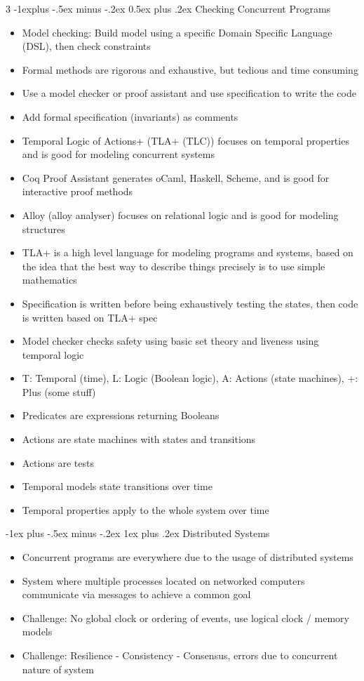 \documentclass[10pt, landscape]{article}
\makeatletter
\renewcommand{\section}{\@startsection{section}{1}{0mm}%
                                {-1ex plus -.5ex minus -.2ex}%
                                {0.5ex plus .2ex}%
                                {\normalfont\large\bfseries}}
\renewcommand{\section}{\@startsection{section}{2}{0mm}%
                                {-1explus -.5ex minus -.2ex}%
                                {0.5ex plus .2ex}%
                                {\normalfont\normalsize\bfseries}}
\renewcommand{\subsection}{\@startsection{subsection}{3}{0mm}%
                                {-1ex plus -.5ex minus -.2ex}%
                                {1ex plus .2ex}%
                                {\normalfont\small\bfseries}}%
\makeatother
\begin{document}
\begin{multicols*}{3}
\section{Checking Concurrent Programs}
\begin{itemize}
    \item Model checking: Build model using a specific Domain Specific Language (DSL), then check constraints
    \item Formal methods are rigorous and exhaustive, but tedious and time consuming
    \item Use a model checker or proof assistant and use specification to write the code
    \item Add formal specification (invariants) as comments
    \item Temporal Logic of Actions+ (TLA+ (TLC)) focuses on temporal properties and is good for modeling concurrent systems
    \item Coq Proof Assistant generates oCaml, Haskell, Scheme, and is good for interactive proof methods
    \item Alloy (alloy analyser) focuses on relational logic and is good for modeling structures
    \item TLA+ is a high level language for modeling programs and systems, based on the idea that the best way to describe things precisely is to use simple mathematics
    \item Specification is written before being exhaustively testing the states, then code is written based on TLA+ spec
    \item Model checker checks safety using basic set theory and liveness using temporal logic
    \item T: Temporal (time), L: Logic (Boolean logic), A: Actions (state machines), +: Plus (some stuff)
    \item Predicates are expressions returning Booleans
    \item Actions are state machines with states and transitions
    \item Actions are tests
    \item Temporal models state transitions over time
    \item Temporal properties apply to the whole system over time
\end{itemize}

\subsection{Distributed Systems}
\begin{itemize}
    \item Concurrent programs are everywhere due to the usage of distributed systems
    \item System where multiple processes located on networked computers communicate via messages to achieve a common goal
    \item Challenge: No global clock or ordering of events, use logical clock / memory models
    \item Challenge: Resilience - Consistency - Consensus, errors due to concurrent nature of system
\end{itemize}


\end{multicols*}
\end{document}
